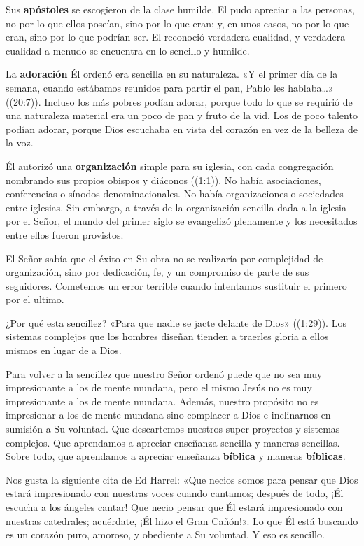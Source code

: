 \documentclass[12pt, twoside, openright]{book}
\begin{document}
Sus \textbf{apóstoles} se escogieron de la clase humilde. El pudo apreciar a las personas, no por lo que ellos poseían, sino por lo que eran; y, en unos casos, no por lo que eran, sino por lo que podrían ser. El reconoció verdadera cualidad, y verdadera cualidad a menudo se encuentra en lo sencillo y humilde. 

La \textbf{adoración} Él ordenó era sencilla en su naturaleza. «Y el primer día de la semana, cuando estábamos reunidos para partir el pan, Pablo les hablaba…» ((20:7)). Incluso los más pobres podían adorar, porque todo lo que se requirió de una naturaleza material era un poco de pan y fruto de la vid. Los de poco talento podían adorar, porque Dios escuchaba en vista del corazón en vez de la belleza de la voz.

Él autorizó una \textbf{organización} simple para su iglesia, con cada congregación nombrando sus propios obispos y diáconos ((1:1)). No había asociaciones, conferencias o sínodos denominacionales. No había organizaciones o sociedades entre iglesias. Sin embargo, a través de la organización sencilla dada a la iglesia por el Señor, el mundo del primer siglo se evangelizó plenamente y los necesitados entre ellos fueron provistos. 

El Señor sabía que el éxito en Su obra no se realizaría por complejidad de organización, sino por dedicación, fe, y un compromiso de parte de sus seguidores. Cometemos un error terrible cuando intentamos sustituir el primero por el ultimo. 

¿Por qué esta sencillez? «Para que nadie se jacte delante de Dios» ((1:29)). Los sistemas complejos que los hombres diseñan tienden a traerles gloria a ellos mismos en lugar de a Dios. 

Para volver a la sencillez que nuestro Señor ordenó puede que no sea muy impresionante a los de mente mundana, pero el mismo Jesús no es muy impresionante a los de mente mundana. Además, nuestro propósito no es impresionar a los de mente mundana sino complacer a Dios e inclinarnos en sumisión a Su voluntad. Que descartemos nuestros super proyectos y sistemas complejos. Que aprendamos a apreciar enseñanza sencilla y maneras sencillas. Sobre todo, que aprendamos a apreciar enseñanza \textbf{bíblica} y maneras \textbf{bíblicas}.

Nos gusta la siguiente cita de Ed Harrel: «Que necios somos para pensar que Dios estará impresionado con nuestras voces cuando cantamos; después de todo, ¡Él escucha a los ángeles cantar! Que necio pensar que Él estará impresionado con nuestras catedrales; acuérdate, ¡Él hizo el Gran Cañón!». Lo que Él está buscando es un corazón puro, amoroso, y obediente a Su voluntad. Y eso es sencillo.
\end{document}
